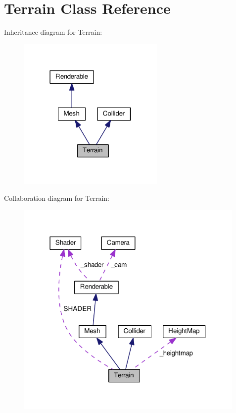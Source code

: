 \hypertarget{class_terrain}{}\section{Terrain Class Reference}
\label{class_terrain}


Inheritance diagram for Terrain\+:\nopagebreak
\begin{figure}[H]
\begin{center}
\leavevmode
\includegraphics[width=202pt]{class_terrain__inherit__graph}
\end{center}
\end{figure}


Collaboration diagram for Terrain\+:\nopagebreak
\begin{figure}[H]
\begin{center}
\leavevmode
\includegraphics[width=316pt]{class_terrain__coll__graph}
\end{center}
\end{figure}
